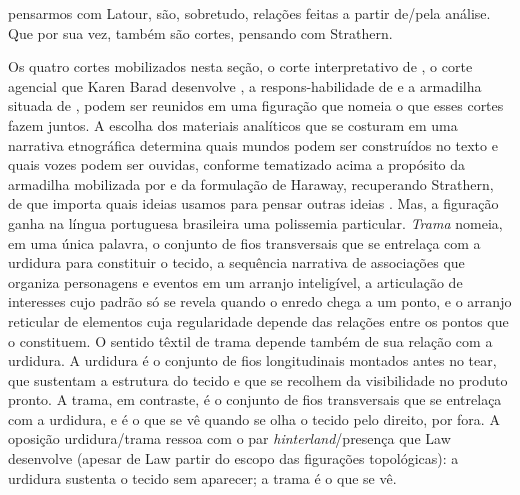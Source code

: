 {pensarmos com Latour, são, sobretudo, relações feitas a partir de/pela análise. Que por sua vez, também são cortes, pensando com Strathern.}

Os quatro cortes mobilizados nesta seção, o corte interpretativo de \textcite{strathern2011cortando}, o corte agencial que Karen Barad desenvolve \parencite{Barad2007Meeting}, a respons-habilidade de \textcite{Haraway2023Ficar} e a armadilha situada de \textcite{costa2024manchando}, podem ser reunidos em uma figuração que nomeia o que esses cortes fazem juntos. A escolha dos materiais analíticos que se costuram em uma narrativa etnográfica determina quais mundos podem ser construídos no texto e quais vozes podem ser ouvidas, conforme tematizado acima a propósito da armadilha mobilizada por \textcite{costa2024manchando} e da formulação de Haraway, recuperando Strathern, de que importa quais ideias usamos para pensar outras ideias \parencite[p.~12]{Haraway2016Staying}. Mas, a figuração ganha na língua portuguesa brasileira uma polissemia particular. \textit{Trama} nomeia, em uma única palavra, o conjunto de fios transversais que se entrelaça com a urdidura para constituir o tecido, a sequência narrativa de associações que organiza personagens e eventos em um arranjo inteligível, a articulação de interesses cujo padrão só se revela quando o enredo chega a um ponto, e o arranjo reticular de elementos cuja regularidade depende das relações entre os pontos que o constituem. O sentido têxtil de trama depende também de sua relação com a urdidura. A urdidura é o conjunto de fios longitudinais montados antes no tear, que sustentam a estrutura do tecido e que se recolhem da visibilidade no produto pronto. A trama, em contraste, é o conjunto de fios transversais que se entrelaça com a urdidura, e é o que se vê quando se olha o tecido pelo direito, por fora. A oposição urdidura/trama ressoa com o par \textit{hinterland}/presença que Law desenvolve \parencite[pp.~40--42, 84]{Law2004After} (apesar de Law partir do escopo das figurações topológicas): a urdidura sustenta o tecido sem aparecer; a trama é o que se vê.

